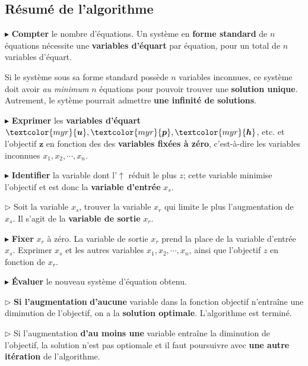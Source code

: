 \documentclass{report}
\begin{document}
\begin{multicols*}{2}
\section{Résumé de l'algorithme}

\noindent 
$\blacktriangleright$ \textbf{Compter} le nombre d'équations. Un système 
en \textbf{forme standard} de $n$ équations nécessite une 
\textcolor{myr}{\textbf{variables d'équart}} par équation, pour un total de 
$n$ variables d'équart. 

\begin{note}{}{}
    Si le système sous sa forme standard possède $n$ variables inconnues, ce système 
    doit avoir \textit{au minimum} $n$ équations pour pouvoir trouver une 
    \textcolor{myb}{\textbf{solution unique}}. Autrement, le sytème pourrait 
    admettre \textbf{une infinité de solutions}.   
\end{note}


\noindent 
$\blacktriangleright$ \textbf{Exprimer} les \textcolor{myr}{\textbf{variables d'équart}} 
$\textcolor{myr}{\boldsymbol{u}}, 
\textcolor{myr}{\boldsymbol{p}}, 
\textcolor{myr}{\boldsymbol{h}}$, etc. et l'objectif $\boldsymbol{z}$ en fonction des des 
\textbf{variables fixées à zéro}, c'est-à-dire les variables inconnues 
$x_1, x_2, \cdots,  x_n$.  

\noindent 
$\blacktriangleright$ \textbf{Identifier} la variable dont l'$\uparrow$ réduit le plus 
$z$; cette variable minimise l'objectif et est donc la 
\textcolor{myb}{\textbf{variable d'entrée}} $x_s$.

\noindent
$\rhd$ Soit la variable $x_s$, trouver la variable $x_r$ qui limite le plus l'augmentation 
de $x_s$. Il s'agit de la \textcolor{myr}{\textbf{variable de sortie}} $x_r$. 


\noindent 
$\blacktriangleright$ \textbf{Fixer} $x_r$ à zéro. La variable de sortie $x_r$ 
prend la place de la variable d'entrée $x_s$. Exprimer $x_s$ et les autres variables 
$x_1, x_2, \cdots, x_n$, ainsi que l'objectif $z$ en fonction de $x_r$. 


\noindent 
$\blacktriangleright$ \textbf{Évaluer} le nouveau système d'équation obtenu. 

\noindent 
$\rhd$ \textbf{Si l'augmentation } 
\textcolor{myr}{\textbf{d'aucune}} variable dans la fonction  objectif n'entraîne une  
diminution de l'objectif, on a la \textbf{solution optimale}. L'algorithme est terminé.  

\noindent 
$\rhd$ Si l'augmentation \textcolor{myr}{\textbf{d'au moins une}} variable entraîne  
la diminution de l'objectif, la solution n'est pas optiomale et il faut poursuivre avec 
\textbf{une autre itération} de l'algorithme.       
\pagebreak 

\end{multicols*}
\end{document}
